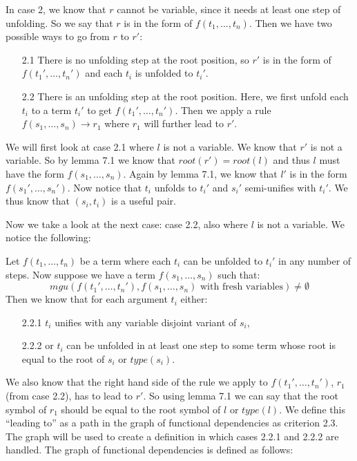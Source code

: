 In case 2, we know that $r$ cannot be variable, since it needs at least one step of unfolding. So we say that $r$ is in the form of $f(t_1, \dots, t_n)$. Then we have two possible ways to go from $r$ to $r'$: 
\begin{enumerate}
    \itemsep 0em
    \item[2.1] There is no unfolding step at the root position, so $r'$ is in the form of $f(t_1', \dots, t_n')$ and each $t_i$ is unfolded to $t_i'$. 
    \item[2.2] There is an unfolding step at the root position. Here, we first unfold each $t_i$ to a term $t_i'$ to get $f(t_1', \dots, t_n')$. Then we apply a rule $f(s_1, \dots, s_n) \rightarrow r_1$ where $r_1$ will further lead to $r'$. 
\end{enumerate}
We will first look at case 2.1 where $l$ is not a variable. We know that $r'$ is not a variable. So by lemma 7.1 we know that $\textit{root}(r') = \textit{root}(l)$ and thus $l$ must have the form $f(s_1, \dots, s_n)$. Again by lemma 7.1, we know that $l'$ is in the form $f(s_1', \dots, s_n')$. Now notice that $t_i$ unfolds to $t_i'$ and $s_i'$ semi-unifies with $t_i'$. We thus know that $(s_i, t_i)$ is a useful pair. 

Now we take a look at the next case: case 2.2, also where $l$ is not a variable. We notice the following: 

Let $f(t_1, \dots, t_n)$ be a term where each $t_i$ can be unfolded to $t_i'$ in any number of steps. Now suppose we have a term $f(s_1, \dots, s_n)$ such that:
\[
\textit{mgu}(f(t_1', \dots, t_n'), f(s_1, \dots, s_n) \text{ with fresh variables}) \neq \emptyset
\]
Then we know that for each argument $t_i$ either:
\begin{enumerate}
    \itemsep 0em
    \item[2.2.1] $t_i$ unifies with any variable disjoint variant of $s_i$, 
    \item[2.2.2] or $t_i$ can be unfolded in at least one step to some term whose root is equal to the root of $s_i$ or $\textit{type}(s_i)$. 
\end{enumerate}  

We also know that the right hand side of the rule we apply to $f(t_1', \dots, t_n')$, $r_1$ (from case 2.2), has to lead to $r'$. So using lemma 7.1 we can say that the root symbol of $r_1$ should be equal to the root symbol of $l$ or $\textit{type}(l)$. We define this ``leading to'' as a path in the graph of functional dependencies as criterion 2.3. The graph will be used to create a definition in which cases 2.2.1 and 2.2.2 are handled. The graph of functional dependencies is defined as follows: 

